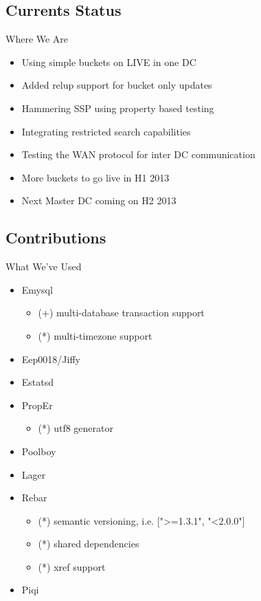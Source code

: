 \documentclass[aspectratio=169]{beamer}
\begin{document}
\subsection{Currents Status}
\begin{frame}{Where We Are}
    \begin{itemize}
        \item Using simple buckets on LIVE in one DC
        \item Added relup support for bucket only updates
        \item Hammering SSP using property based testing
        \item Integrating restricted search capabilities
        \item Testing the WAN protocol for inter DC communication
        \item More buckets to go live in H1 2013
        \item Next Master DC coming on H2 2013
    \end{itemize}
\end{frame}

\subsection{Contributions}
\begin{frame}{What We've Used}
    \begin{itemize}
        \item Emysql
            \begin{itemize}
                \item (+) multi-database transaction support
                \item (*) multi-timezone support
            \end{itemize}
        \item Eep0018/Jiffy
        \item Estatsd
        \item PropEr
            \begin{itemize}
                \item (*) utf8 generator
            \end{itemize}
        \item Poolboy
        \item Lager
        \item Rebar
            \begin{itemize}
                \item (*) semantic versioning, i.e. [">=1.3.1", "<2.0.0"]
                \item (*) shared dependencies
                \item (*) xref support
            \end{itemize}
        \item Piqi
    \end{itemize}
\end{frame}
\end{document}
